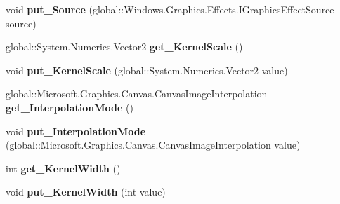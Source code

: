 \begin{DoxyCompactItemize}
void {\bfseries put\+\_\+\+Source} (global\+::\+Windows.\+Graphics.\+Effects.\+I\+Graphics\+Effect\+Source source)
\item 
\mbox{\label{interface_microsoft_1_1_graphics_1_1_canvas_1_1_effects_1_1_i_convolve_matrix_effect_a70e52e1ad7aa0146de7c12790467cdac}} 
global\+::\+System.\+Numerics.\+Vector2 {\bfseries get\+\_\+\+Kernel\+Scale} ()
\item 
\mbox{\label{interface_microsoft_1_1_graphics_1_1_canvas_1_1_effects_1_1_i_convolve_matrix_effect_a0b5edbc7813036ace1e989a79c0d3b5b}} 
void {\bfseries put\+\_\+\+Kernel\+Scale} (global\+::\+System.\+Numerics.\+Vector2 value)
\item 
\mbox{\label{interface_microsoft_1_1_graphics_1_1_canvas_1_1_effects_1_1_i_convolve_matrix_effect_a9ea4853f26cd360a4ee8cdd57d2ddb1e}} 
global\+::\+Microsoft.\+Graphics.\+Canvas.\+Canvas\+Image\+Interpolation {\bfseries get\+\_\+\+Interpolation\+Mode} ()
\item 
\mbox{\label{interface_microsoft_1_1_graphics_1_1_canvas_1_1_effects_1_1_i_convolve_matrix_effect_ae0a64fa71921ff52fd00b4febdbcf729}} 
void {\bfseries put\+\_\+\+Interpolation\+Mode} (global\+::\+Microsoft.\+Graphics.\+Canvas.\+Canvas\+Image\+Interpolation value)
\item 
\mbox{\label{interface_microsoft_1_1_graphics_1_1_canvas_1_1_effects_1_1_i_convolve_matrix_effect_ae8d53bee22d15fc843c0f63201ff8931}} 
int {\bfseries get\+\_\+\+Kernel\+Width} ()
\item 
\mbox{\label{interface_microsoft_1_1_graphics_1_1_canvas_1_1_effects_1_1_i_convolve_matrix_effect_ae007495f346df8c7fdc4c2fd7ecb6178}} 
void {\bfseries put\+\_\+\+Kernel\+Width} (int value)
\item 
\mbox{\label{interface_microsoft_1_1_graphics_1_1_canvas_1_1_effects_1_1_i_convolve_matrix_effect_ac5214a9cfe172dd07b688f7d45ce8e38}} 

\end{DoxyCompactItemize}
